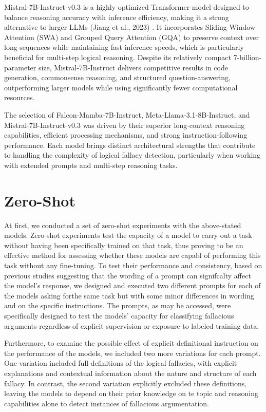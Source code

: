 \par
Mistral-7B-Instruct-v0.3 is a highly optimized Transformer model designed to balance reasoning accuracy with inference efficiency, making it a strong alternative to larger LLMs (Jiang et al., 2023) \cite{jiang2023mistral7b}. It incorporates Sliding Window Attention (SWA) and Grouped Query Attention (GQA) to preserve context over long sequences while maintaining fast inference speeds, which is particularly beneficial for multi-step logical reasoning. Despite its relatively compact 7-billion-parameter size, Mistral-7B-Instruct delivers competitive results in code generation, commonsense reasoning, and structured question-answering, outperforming larger models while using significantly fewer computational resources.
\par
The selection of Falcon-Mamba-7B-Instruct, Meta-Llama-3.1-8B-Instruct, and Mistral-7B-Instruct-v0.3 was driven by their superior long-context reasoning capabilities, efficient processing mechanisms, and strong instruction-following performance. Each model brings distinct architectural strengths that contribute to handling the complexity of logical fallacy detection, particularly when working with extended prompts and multi-step reasoning tasks.



\section{Zero-Shot}
At first, we conducted a set of zero-shot experiments with the above-stated models. Zero-shot experiments test the capacity of a model to carry out a task without having been specifically trained on that task, thus proving to be an effective method for assessing whether these models are capabl of performing this task without any fine-tuning. To test their performance and consistency, based on previous studies suggesting that the wording of a prompt can signifcalty affect the model's response, we designed and executed two different prompts for each of the models asking forthe same task but with some minor differences in wording and on the specific instructions. The prompts, as may be accessed, were specifically designed to test the models' capacity for classifying fallacious arguments regardless of explicit supervision or exposure to labeled training data.

Furthermore, to examine the possible effect of explicit definitional instruction on the performance of the models, we included two more variations for each prompt. One variation included full definitions of the logical fallacies, with explicit explanations and contextual information about the nature and structure of each fallacy. In contrast, the second variation explicitly excluded these definitions, leaving the models to depend on their prior knowledge on te topic and reasoning capabilities alone to detect instances of fallacious argumentation.

